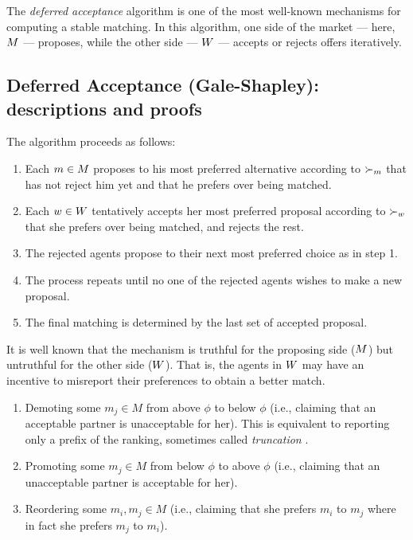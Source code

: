 The \emph{deferred acceptance} algorithm \cite{gale1962college} is one of the most well-known mechanisms for computing a stable matching. 
In this algorithm, one side of the market --- here, $M$ --- proposes, while the other side --- $W$ --- accepts or rejects offers iteratively. 
%
\begin{toappendix}
\subsection{Deferred Acceptance (Gale-Shapley): descriptions and proofs}
The algorithm proceeds as follows:
\begin{enumerate}
    \item Each $m \in M$ proposes to his most preferred alternative according to $\succ_{m}$ that has not reject him yet and that he prefers over being matched. 

    \item Each $w \in W$ tentatively accepts her most preferred proposal according to $\succ_{w}$ that she prefers over being matched, and rejects the rest.

    \item The rejected agents propose to their next most preferred choice as in step 1.

    \item The process repeats until no one of the rejected agents wishes to make a new proposal.

    \item The final matching is determined by the last set of accepted proposal.
\end{enumerate}
\end{toappendix}

It is well known that the mechanism is truthful for the proposing side ($M$) but untruthful for the other side ($W$).
That is, the agents in $W$ may have an incentive to misreport their preferences to obtain a better match.

\begin{enumerate}
\item 
Demoting some $m_j\in M$ from above $\phi$ to below $\phi$ (i.e., claiming that an acceptable partner is unacceptable for her). This is equivalent to reporting only a prefix of the ranking, sometimes called \emph{truncation}  \citep{roth1999truncation,ehlers2008truncation,coles2014optimal}.
\item 
Promoting some $m_j\in M$ from below $\phi$ to above $\phi$
(i.e., claiming that an unacceptable partner is acceptable for her). 
\item 
Reordering some $m_i,m_j\in M$ (i.e., claiming that she prefers $m_i$ to $m_j$ where in fact she prefers $m_j$ to $m_i$).
\end{enumerate}

